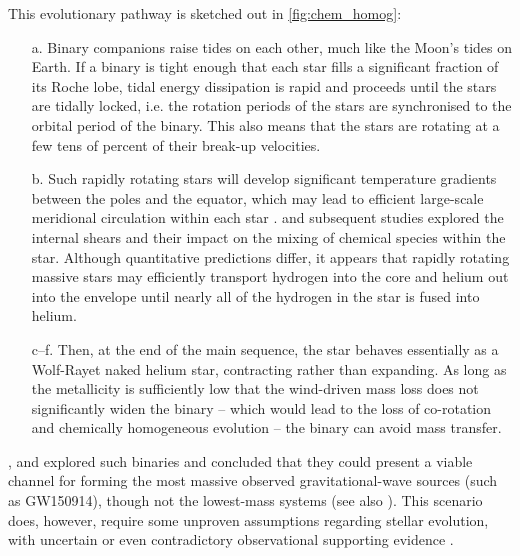 \documentclass[review]{elsarticle}
\begin{document}
This evolutionary pathway is sketched out in \autoref{fig:chem_homog}:
\begin{itemize}
\item[a.] Binary companions raise tides on each other, much like the Moon's tides on Earth.  If a binary is tight enough that each star fills a significant fraction of its Roche lobe, tidal energy dissipation is rapid and proceeds until the stars are tidally locked, i.e. the rotation periods of the stars are synchronised to the orbital period of the binary. This also means that the stars are rotating at a few tens of percent of their break-up velocities.  
\item[b.] Such rapidly rotating stars will develop significant temperature gradients between the poles and the equator, which may lead to efficient large-scale meridional circulation within each star \citep{Eddington:1925,Sweet:1950}.  \citet{EndalSofia:1978} and subsequent studies \citep[e.g.,][]{Heger:2000,MaederMeynet:2000,Yoon:2006,Szecsi:2015} explored the internal shears and their impact on the mixing of chemical species within the star.  Although quantitative predictions differ, it appears that rapidly rotating massive stars may efficiently transport hydrogen into the core and helium out into the envelope until nearly all of the hydrogen in the star is fused into helium.  
\item[c--f.] Then, at the end of the main sequence, the star behaves essentially as a Wolf-Rayet naked helium star, contracting rather than expanding. As long as the metallicity is sufficiently low that the wind-driven mass loss does not significantly widen the binary -- which would lead to the loss of co-rotation and chemically homogeneous evolution \citep{deMink:2009} -- the binary can avoid mass transfer.  
\end{itemize}

\citet{MandeldeMink:2016,deMinkMandel:2016}, and \citet{Marchant:2016} explored such binaries and concluded that they could present a viable channel for forming the most massive observed gravitational-wave sources (such as GW150914), though not the lowest-mass systems (see also \cite{duBoisson:2020,Riley:2020}).  This scenario does, however, require some unproven assumptions regarding stellar evolution, with uncertain or even contradictory observational supporting evidence \citep{Almeida:2015, AbdulMasih:2021}.
\end{document}
